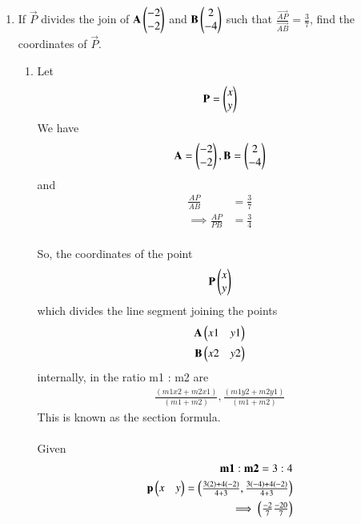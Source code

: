 \documentclass[journal,12pt,twocolumn]{IEEEtran}
\renewcommand\thesection{\arabic{section}}
\begin{document}
\begin{enumerate}[label=\thesection.\arabic*.,ref=\thesection.\theenumi]
\item If $\vec{P}$ divides the join of $\mathbf{A}\begin{pmatrix}-2\\-2\end{pmatrix}$ and $\mathbf{B}\begin{pmatrix}2\\-4\end{pmatrix}$ such that $\frac{\vec{AP}}{\vec{AB}} = \frac{3}{7}$, \textrm find the coordinates of $\vec{P}$.
\\
\solution\begin{enumerate}
    \item Let 
    \begin{align}
     \mathbf{P}=\begin{pmatrix}x\\y\end{pmatrix}   
    \end{align}
    We have \begin{align}
    \mathbf{A}=\begin{pmatrix}-2\\-2\end{pmatrix},
    \mathbf{B}=\begin{pmatrix}2\\-4\end{pmatrix}
    \end{align}
    and
    \begin{align}
        \frac{AP}{AB} &= \frac{3}{7}\\
        \implies \frac{AP}{PB} &= \frac{3}{4}\\
        \end{align}
        
         So, the coordinates of the point 
         \begin{align}
             \mathbf{P}\begin{pmatrix}x\\y\end{pmatrix} 
         \end{align}
         which divides the line segment joining the points 
         \begin{align}
             \mathbf{A}\begin{pmatrix}x1&y1\end{pmatrix}\\ \mathbf{B} \begin{pmatrix}x2&y2\end{pmatrix}
         \end{align}
         internally, in the ratio m1 : m2 are 
         \begin{align}
             \frac{(m1x2 + m2x1)}{(m1 + m2 )},\frac{(m1y2 + m2y1)}{(m1 + m2 )}
         \end{align}
         This is known as the section formula.\\ \\
          Given\\
        \begin{align}
            \mathbf{m1}: \mathbf {m2} = 3:4\\
            \mathbf{p}\begin{pmatrix}x&y\end{pmatrix}= \begin{pmatrix}\frac{3(2)+4(-2)}{4+3},\frac{3(-4)+4(-2)}{4+3}\end{pmatrix}\\
            \implies\begin{pmatrix}\frac{-2}{7} \frac{-20}{7}\end{pmatrix}
        \end{align}


\end{enumerate}
\end{enumerate}
\end{document}
